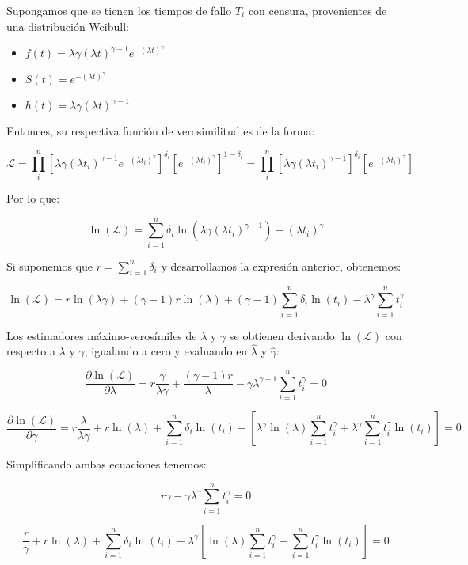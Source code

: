 \documentclass[
  a4paper,
  oneside,
  openany]{book}
\providecommand{\tightlist}{%
  \setlength{\itemsep}{0pt}\setlength{\parskip}{0pt}}
\begin{document}
Supongamos que se tienen los tiempos de fallo \(T_{i}\) con censura, provenientes de una distribución Weibull:

\begin{itemize}
\tightlist
\item
  \(f(t) = \lambda \gamma(\lambda t)^{\gamma-1}e^{-(\lambda t)^\gamma}\)
\item
  \(S(t) = e^{-(\lambda t)^\gamma}\)
\item
  \(h(t) = \lambda \gamma(\lambda t)^{\gamma-1}\)
\end{itemize}

Entonces, su respectiva función de verosimilitud es de la forma:

\[
\mathscr{L} = \prod_{i}^{n}\left[\lambda \gamma(\lambda t_i)^{\gamma-1}e^{-(\lambda t_i)^\gamma}\right]^{\delta_i}\left[e^{-(\lambda t_i)^\gamma}\right]^{1-\delta_i} = \prod_{i}^{n}\left[\lambda \gamma(\lambda t_i)^{\gamma-1}\right]^{\delta_i}\left[e^{-(\lambda t_i)^\gamma}\right]
\]

Por lo que:

\[
\ln(\mathscr{L}) = \sum_{i=1}^{n}\delta_i\ln(\lambda \gamma(\lambda t_i)^{\gamma -1})-(\lambda t_i)^\gamma
\]

Si suponemos que \(r=\sum_{i = 1}^{n}\delta_{i}\) y desarrollamos la expresión anterior, obtenemos:

\[
\ln(\mathscr{L}) =r\ln(\lambda \gamma)+(\gamma -1)r\ln (\lambda)+(\gamma -1)\sum_{i=1}^{n}\delta_i\ln(t_i)-\lambda^{\gamma}\sum_{i=1}^{n}t_i^{\gamma}
\]

Los estimadores máximo-verosímiles de \(\lambda\) y \(\gamma\) se obtienen derivando \(\ln(\mathscr{L})\) con respecto a \(\lambda\) y \(\gamma\), igualando a cero y evaluando en \(\hat \lambda\) y \(\hat \gamma\):

\[
\frac{\partial \ln(\mathscr{L})}{\partial \lambda}=r\frac{\gamma}{\lambda \gamma}+\frac{(\gamma-1)r}{\lambda}-\gamma \lambda^{\gamma -1}\sum_{i=1}^{n}t_i^{\gamma}=0
\]

\[
\frac{\partial \ln(\mathscr{L})}{\partial \gamma}=r\frac{\lambda}{\lambda \gamma}+r\ln(\lambda)+\sum_{i=1}^{n}\delta_i\ln(t_i)-\left[\lambda^{\gamma}\ln(\lambda)\sum_{i=1}^{n}t_i^{\gamma}+\lambda^\gamma \sum_{i=1}^{n}t_i^{\gamma}\ln(t_i)\right]=0
\]

Simplificando ambas ecuaciones tenemos:

\[
r\gamma-\gamma \lambda^\gamma\sum_{i=1}^{n}t_i^\gamma=0
\]

\[
\frac{r}{\gamma}+r\ln(\lambda)+\sum_{i=1}^{n}\delta_i\ln(t_i)-\lambda^\gamma\left[\ln(\lambda)\sum_{i=1}^{n}t_i^{\gamma}-\sum_{i=1}^{n}t_i^{\gamma}\ln(t_i)\right]=0
\]
\end{document}
